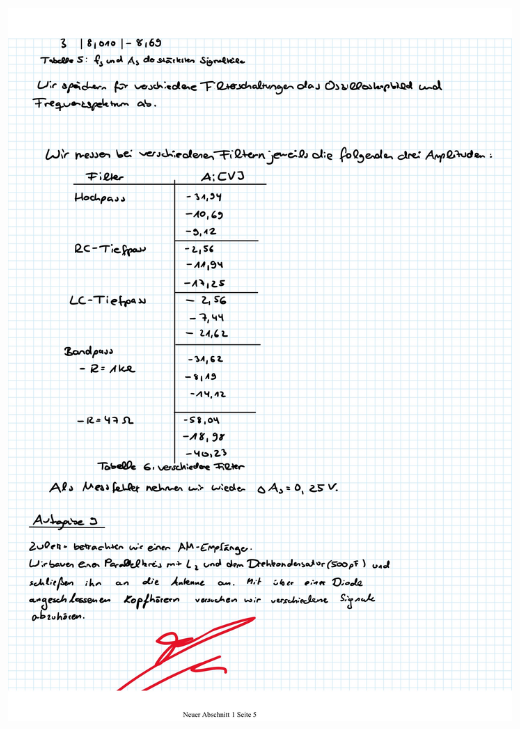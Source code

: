 \documentclass{article}
\begin{document}
\includegraphics[width=\textwidth]{graphics/mess5.jpg}
\newpage

\addtocounter{table}{6}
\end{document}
